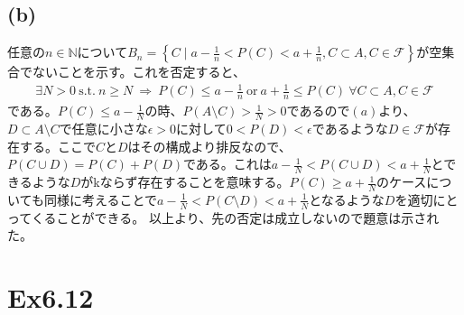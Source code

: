 \documentclass{article}
\begin{document}
\subsection{(b)}
任意の$n \in \mathbb{N}$について$B_n = \left\{ C \mid a - \frac{1}{n} < P(C) < a + \frac{1}{n}, C \subset A, C \in \mathcal{F}\right\}$が空集合でないことを示す。これを否定すると、
\begin{align*}
	\exists N > 0\ \text{s.t.}\ n \geq N\ \Rightarrow\ P(C) \leq a - \frac{1}{n}\ \text{or}\ a + \frac{1}{n} \leq P(C)\ \forall C \subset A, C \in \mathcal{F}
\end{align*}
である。$P(C) \leq a - \frac{1}{N}$の時、$P(A \setminus C) > \frac{1}{N} > 0$であるので$(a)$より、$D \subset A \setminus C$で任意に小さな$\epsilon > 0$に対して$0 < P(D) < \epsilon$であるような$D \in \mathcal{F}$が存在する。ここで$C$と$D$はその構成より排反なので、$P(C \cup D) = P(C) + P(D)$である。これは$a - \frac{1}{N} < P(C\cup D) < a + \frac{1}{N}$とできるような$D$がkならず存在することを意味する。$P(C) \geq a + \frac{1}{N}$のケースについても同様に考えることで$a - \frac{1}{N} < P(C\setminus D) < a + \frac{1}{N}$となるような$D$を適切にとってくることができる。
以上より、先の否定は成立しないので題意は示された。


\section{Ex6.12}
\end{document}
